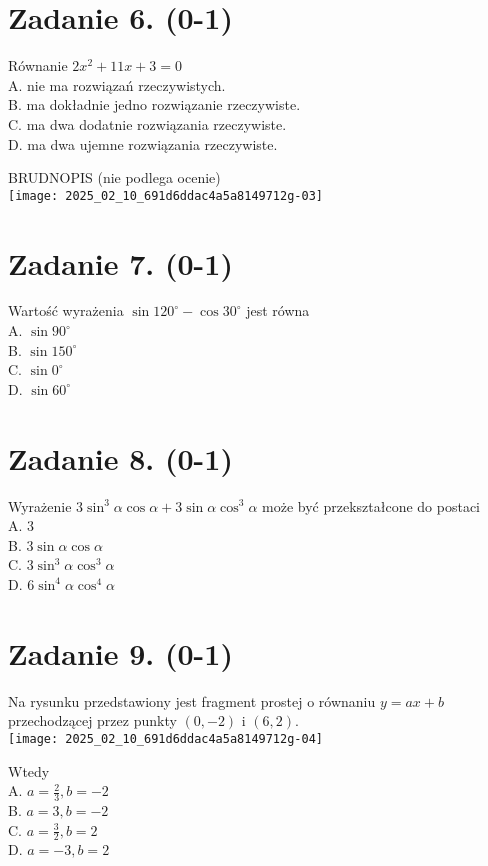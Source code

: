 \documentclass[10pt]{article}
\begin{document}
\section*{Zadanie 6. (0-1)}
Równanie \(2 x^{2}+11 x+3=0\)\\
A. nie ma rozwiązań rzeczywistych.\\
B. ma dokładnie jedno rozwiązanie rzeczywiste.\\
C. ma dwa dodatnie rozwiązania rzeczywiste.\\
D. ma dwa ujemne rozwiązania rzeczywiste.

BRUDNOPIS (nie podlega ocenie)\\
\texttt{[image: 2025\_02\_10\_691d6ddac4a5a8149712g-03]}

\section*{Zadanie 7. (0-1)}
Wartość wyrażenia \(\sin 120^{\circ}-\cos 30^{\circ}\) jest równa\\
A. \(\sin 90^{\circ}\)\\
B. \(\sin 150^{\circ}\)\\
C. \(\sin 0^{\circ}\)\\
D. \(\sin 60^{\circ}\)

\section*{Zadanie 8. (0-1)}
Wyrażenie \(3 \sin ^{3} \alpha \cos \alpha+3 \sin \alpha \cos ^{3} \alpha\) może być przekształcone do postaci\\
A. 3\\
B. \(3 \sin \alpha \cos \alpha\)\\
C. \(3 \sin ^{3} \alpha \cos ^{3} \alpha\)\\
D. \(6 \sin ^{4} \alpha \cos ^{4} \alpha\)

\section*{Zadanie 9. (0-1)}
Na rysunku przedstawiony jest fragment prostej o równaniu \(y=a x+b\) przechodzącej przez punkty \((0,-2)\) i \((6,2)\).\\
\texttt{[image: 2025\_02\_10\_691d6ddac4a5a8149712g-04]}

Wtedy\\
A. \(a=\frac{2}{3}, b=-2\)\\
B. \(a=3, b=-2\)\\
C. \(a=\frac{3}{2}, b=2\)\\
D. \(a=-3, b=2\)
\end{document}
